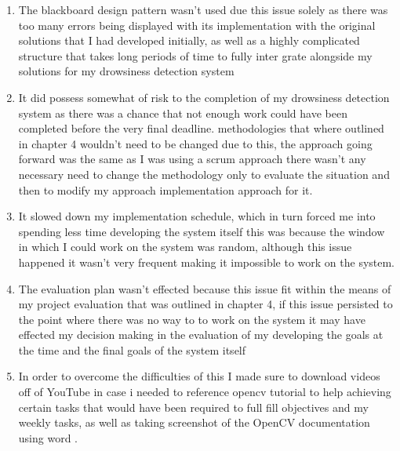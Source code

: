 \begin{enumerate}
 \begin{enumerate}
        \item The blackboard design pattern wasn't used due this issue solely as there was too many errors being displayed with its                implementation with the original solutions that I had developed initially, as well as a highly complicated structure that takes long periods of time to fully inter grate alongside my solutions for my drowsiness detection system
        \item It did possess somewhat of risk to the completion of my drowsiness detection system as there was a chance that not enough work could  have been completed before the very final deadline.
\itemThe methodologies that where outlined in chapter 4 wouldn't need to be changed due to this, the approach going forward was the same as I was using a scrum approach there wasn't any necessary need to change the methodology only to evaluate the situation and then to modify my approach implementation approach for it.  
 \item It slowed down my implementation schedule, which in turn forced me into spending less time developing the system itself this was because the window in which I could work on the system was random, although this issue happened it wasn't very frequent making it impossible to work on the system.																																														\item The evaluation plan wasn't effected because this issue fit within the means of my project evaluation that was outlined in chapter 4, if this issue persisted to the point where there was no way to to work on the system it may have effected my decision making in the evaluation of my developing the goals at the time and the final goals of the system itself
 \item In order to overcome the difficulties of this I made sure to download videos off of YouTube in case i needed to reference opencv tutorial to help achieving certain tasks that would have been required to full fill objectives and my weekly tasks, as well as taking screenshot of the OpenCV documentation using word .
   \end{enumerate}


\end{enumerate}
